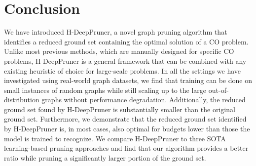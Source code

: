 \documentclass[letterpaper]{article} %
\begin{document}
\section{Conclusion}
We have introduced H-DeepPruner, a novel graph pruning algorithm that identifies a reduced ground set containing the optimal solution of a CO problem. Unlike most previous methods, which are manually designed for specific CO problems, H-DeepPruner is a general framework that can be combined with any existing heuristic of choice for large-scale problems. In all the settings we have investigated using real-world graph datasets, we find that training can be done on small instances of random graphs while still scaling up to the large out-of-distribution graphs without performance degradation. Additionally, the reduced ground set found by H-DeepPruner is substantially smaller than the original ground set. Furthermore, we demonstrate that the reduced ground set identified by H-DeepPruner is, in most cases, also optimal for budgets lower than those the model is trained to recognize. We compare H-DeepPruner to three SOTA learning-based pruning approaches and find that our algorithm provides a better ratio while pruning a significantly larger portion of the ground set.



\end{document}
